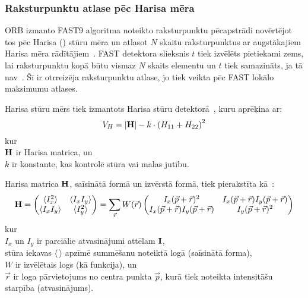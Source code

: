 \subsubsection{Raksturpunktu atlase pēc Harisa mēra}
ORB izmanto FAST9 algoritma noteikto raksturpunktu pēcapstrādi novērtējot tos
pēc Harisa () stūru mēra un atlasot $N$ skaitu
raksturpunktus ar augstākajiem Harisa mēra rādītājiem~\cite{ORB}.
FAST detektora slieksnis $t$ tiek izvēlēts pietiekami zems, lai
raksturpunktu kopā būtu vismaz $N$ skaits elementu un $t$ tiek samazināts,
ja tā nav~\cite{ORB}.
Šī ir otrreizēja raksturpunktu atlase, jo tiek veikta pēc FAST 
lokālo maksimumu atlases.

Harisa stūru mērs tiek izmantots Harisa stūru detektorā~\cite{Harris}\cite{FAST},
kuru aprēķina ar:
\begin{equation}
	V_H = |\mathbf{H}| - k \cdot {(H_{11}+H_{22})}^2
\end{equation}
kur\\
$\mathbf{H}$ ir Harisa matrica\cite{Harris}\cite{FAST}, un\\
$k$ ir konstante, kas kontrolē stūra vai malas jutību.

Harisa matrica $\mathbf{H}$, saīsinātā formā un izvērstā formā,
tiek pierakstīta kā~\cite{Harris}\cite{FAST}:
\begin{equation}\label{eq:harris}
	\mathbf{H} =
		\begin{pmatrix}
			\langle I_x^2 \rangle & \langle I_xI_y \rangle \\
			\langle I_xI_y \rangle & \langle I_y^2 \rangle
		\end{pmatrix}
		=
		\sum_{\vec{r}} W(\vec{r})
			\begin{pmatrix}
				I_x(\vec{p}+\vec{r})^2 & I_x(\vec{p}+\vec{r}) I_y(\vec{p}+\vec{r}) \\
				I_x(\vec{p}+\vec{r}) I_y(\vec{p}+\vec{r}) & I_y(\vec{p}+\vec{r})^2
			\end{pmatrix}
\end{equation}
kur\\
$I_x$ un $I_y$ ir parciālie atvasinājumi attēlam $\mathbf{I}$,\\
stūra iekavas $\langle {\,} \rangle$ apzīmē summēšanu noteiktā logā
(saīsinātā forma),\\
$W$ ir izvēlētais logs (kā funkcija), un\\
$\vec{r}$ ir loga pārvietojums no centra punkta $\vec{p}$, kurā tiek noteikta
intensitāšu starpība (atvasinājums).

